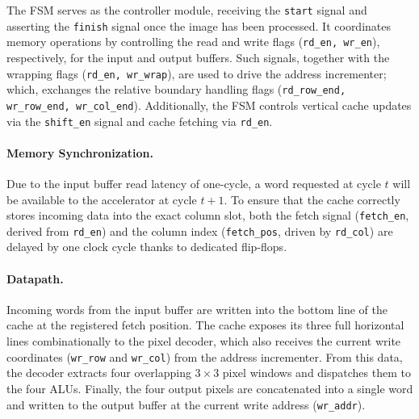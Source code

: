 The FSM serves as the controller module, receiving the \texttt{start} signal and asserting the \texttt{finish} signal once the image has been processed. It coordinates memory operations by controlling the read and write flags (\texttt{rd\_en, wr\_en}), respectively, for the input and output buffers. Such signals, together with the wrapping flags (\texttt{rd\_en, wr\_wrap}), are used to drive the address incrementer; which, exchanges the relative boundary handling flags (\texttt{rd\_row\_end, wr\_row\_end, wr\_col\_end}). Additionally, the FSM controls vertical cache updates via the \texttt{shift\_en} signal and cache fetching via \texttt{rd\_en}.
    
\paragraph{Memory Synchronization.} 

Due to the input buffer read latency of one-cycle, a word requested at cycle $t$ will be available to the accelerator at cycle $t+1$. To ensure that the cache correctly stores incoming data into the exact column slot, both the fetch signal (\texttt{fetch\_en}, derived from \texttt{rd\_en}) and the column index (\texttt{fetch\_pos}, driven by \texttt{rd\_col}) are delayed by one clock cycle thanks to dedicated flip-flops.

\paragraph{Datapath.} 

Incoming words from the input buffer are written into the bottom line of the cache at the registered fetch position. The cache exposes its three full horizontal lines combinationally to the pixel decoder, which also receives the current write coordinates (\texttt{wr\_row} and \texttt{wr\_col}) from the address incrementer. From this data, the decoder extracts four overlapping $3\times3$ pixel windows and dispatches them to the four ALUs. Finally, the four output pixels are concatenated into a single word and written to the output buffer at the current write address (\texttt{wr\_addr}).

